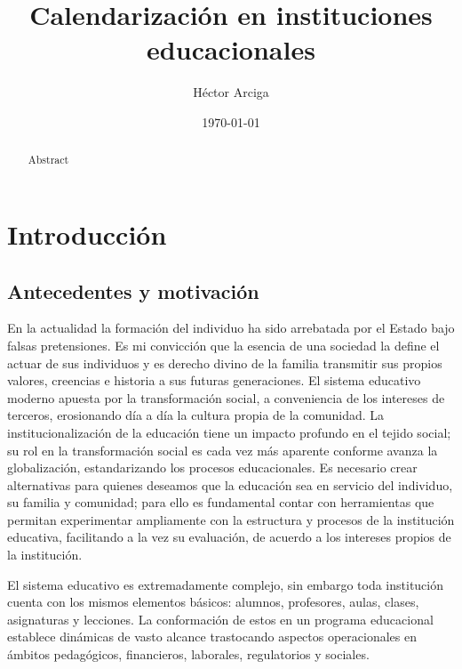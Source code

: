 \documentclass[spanish,draft,12pt,headsepline,footsepline,paper=letter]{scrreprt}
\begin{document}
\title{Calendarización en instituciones educacionales}
\author{Héctor Arciga}
\date{\today}

\maketitle

\begin{abstract}
Abstract
\end{abstract}

\begin{spacing}{1}
\tableofcontents
\glsaddall
\printglossaries
\listoffigures
\listoftables
\end{spacing}

\chapter{Introducción}

\section{Antecedentes y motivación}

En la actualidad la formación del individuo ha sido arrebatada por el Estado bajo falsas pretensiones. Es mi convicción que la esencia de una sociedad la define el actuar de sus individuos y es derecho divino de la familia transmitir sus propios valores, creencias e historia a sus futuras generaciones. El sistema educativo moderno apuesta por la transformación social, a conveniencia de los intereses de terceros, erosionando día a día la cultura propia de la comunidad. La institucionalización de la educación tiene un impacto profundo en el tejido social; su rol en la transformación social es cada vez más aparente conforme avanza la globalización, estandarizando los procesos educacionales. Es necesario crear alternativas para quienes deseamos que la educación sea en servicio del individuo, su familia y comunidad; para ello es fundamental contar con herramientas que permitan experimentar ampliamente con la estructura y procesos de la institución educativa, facilitando a la vez su evaluación, de acuerdo a los intereses propios de la institución. 

El sistema educativo es extremadamente complejo, sin embargo toda institución cuenta con los mismos elementos básicos: alumnos, profesores, aulas, clases, asignaturas y lecciones. La conformación de estos en un programa educacional establece dinámicas de vasto alcance trastocando aspectos operacionales en ámbitos pedagógicos, financieros, laborales, regulatorios y sociales.
\end{document}
